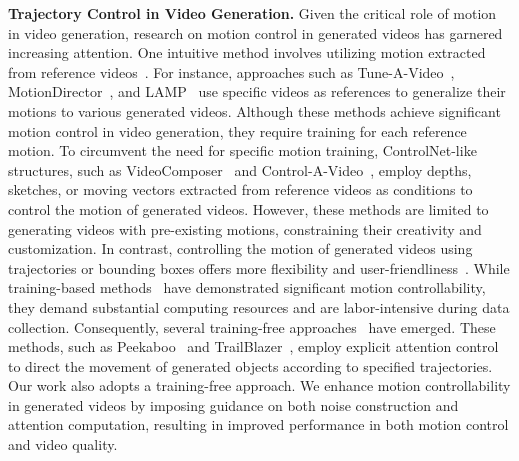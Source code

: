 \noindent\textbf{Trajectory Control in Video Generation.}
%
Given the critical role of motion in video generation, research on motion control in generated videos has garnered increasing attention. One intuitive method involves utilizing motion extracted from reference videos~\citep{videop2p,dreamvideo,videocomposer,controlvideo}. For instance, approaches such as Tune-A-Video~\citep{tav}, MotionDirector~\citep{motiondirector}, and LAMP~\citep{lamp} use specific videos as references to generalize their motions to various generated videos. Although these methods achieve significant motion control in video generation, they require training for each reference motion. To circumvent the need for specific motion training, ControlNet-like structures, such as VideoComposer~\citep{videocomposer} and Control-A-Video~\citep{controlavideo}, employ depths, sketches, or moving vectors extracted from reference videos as conditions to control the motion of generated videos. However, these methods are limited to generating videos with pre-existing motions, constraining their creativity and customization.
In contrast, controlling the motion of generated videos using trajectories or bounding boxes offers more flexibility and user-friendliness~\citep{mcdiff,dragvideo,boximator,directavideo,finegrained}. While training-based methods~\citep{mcdiff,dragnvwa,dragvideo,motionctrl,boximator} have demonstrated significant motion controllability, they demand substantial computing resources and are labor-intensive during data collection. Consequently, several training-free approaches~\citep{directavideo,finegrained} have emerged. These methods, such as Peekaboo~\citep{peekaboo} and TrailBlazer~\citep{trailblazer}, employ explicit attention control to direct the movement of generated objects according to specified trajectories. Our work also adopts a training-free approach. We enhance motion controllability in generated videos by imposing guidance on both noise construction and attention computation, resulting in improved performance in both motion control and video quality.

